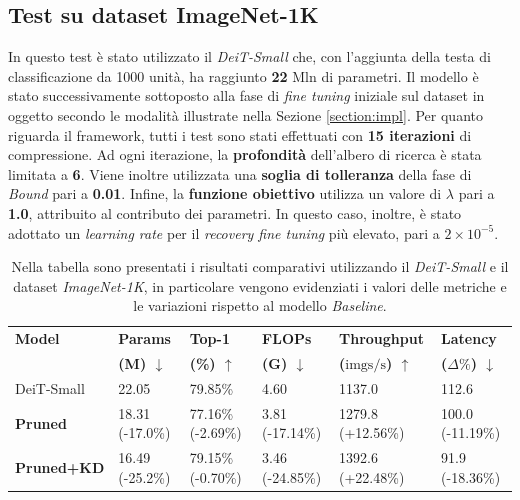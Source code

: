 \subsection{Test su dataset ImageNet-1K}
\label{deit-imagenet}
In questo test è stato utilizzato il \textit{DeiT-Small} che, con
l'aggiunta della testa di classificazione da 1000 unità, ha raggiunto
\textbf{22} Mln di parametri. Il modello è stato successivamente sottoposto
alla fase di \textit{fine tuning} iniziale sul dataset in oggetto secondo le
modalità illustrate nella Sezione \ref{section:impl}. Per quanto riguarda il
framework, tutti i test sono stati effettuati con \textbf{15 iterazioni} di
compressione. Ad ogni iterazione, la \textbf{profondità} dell'albero di ricerca
è stata limitata a \textbf{6}. Viene inoltre utilizzata una \textbf{soglia di
    tolleranza} della fase di \textit{Bound} pari a \textbf{0.01}. Infine, la
\textbf{funzione obiettivo} utilizza un valore di \textbf{$\lambda$} pari a
\textbf{1.0}, attribuito al contributo dei parametri. In questo caso, inoltre, è stato adottato un \textit{learning rate} per il \textit{recovery fine tuning} più elevato, pari a $2 \times 10^{-5}$.
\begin{table}[H]
    \centering
    \footnotesize
    \setlength{\tabcolsep}{4pt}
    \begin{tabular}{@{} l l l l l l @{}}
       \toprule
        \textbf{Model} & \textbf{Params} & \textbf{Top-1} & \textbf{FLOPs} & \textbf{Throughput} & \textbf{Latency} \\ 
                       & \textbf{(M) $\downarrow$}    & \textbf{(\%) $\uparrow$}  & \textbf{(G) $\downarrow$}   & \textbf{($\text{imgs}/\text{s}$) $\uparrow$} & \textbf{($\Delta\%$) $\downarrow$} \\ 
        \midrule
        DeiT-Small         & 22.05 \hphantom{(-00.0\%)}                 & 79.85\% \hphantom{(-0.00\%)}                 & 4.60 \hphantom{(-00.00\%)}          & 1137.0 \hphantom{(+00.00\%)}                    & 112.6 \hphantom{(-00.00\%)}               \\
        \midrule
        \textbf{Pruned}    & 18.31 (-17.0\%)                            & 77.16\% (-2.69\%)                            & 3.81 (-17.14\%)                     & 1279.8 (+12.56\%)                               & 100.0 (-11.19\%)                          \\
        \midrule
        \textbf{Pruned+KD} & 16.49 (-25.2\%)                            & 79.15\% (-0.70\%)                            & 3.46 (-24.85\%)                     & 1392.6 (+22.48\%)                               & 91.9 (-18.36\%)                           \\
        \bottomrule
    \end{tabular}
    \vspace{10pt}
    \caption{Nella tabella sono presentati i risultati comparativi utilizzando il \textit{DeiT-Small} e il dataset \textit{ImageNet-1K}, in particolare vengono evidenziati i valori delle metriche e le variazioni rispetto al modello \textit{Baseline}.}
    \label{tab:risultati-ImageNet-deit}
\end{table}

